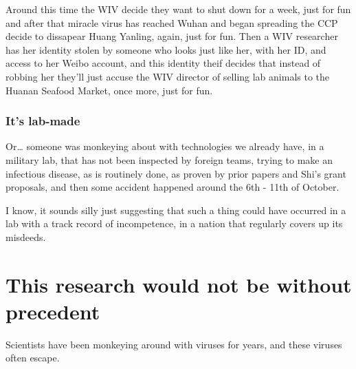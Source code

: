 \documentclass[11pt]{article}
\begin{document}
Around this time the WIV decide they want to shut down for a week, just for fun and after that miracle virus has reached Wuhan and began spreading the CCP decide to dissapear Huang Yanling, again, just for fun. Then a WIV researcher has her identity stolen by someone who looks just like her, with her ID, and access to her Weibo account, and this identity theif decides that instead of robbing her they'll just accuse the WIV director of selling lab animals to the Huanan Seafood Market, once more, just for fun.
\subsubsection{It's lab-made}
\label{sec:orgbdf7703}
Or\ldots{} someone was monkeying about with technologies we already have, in a military lab, that has not been inspected by foreign teams, trying to make an infectious disease, as is routinely done, as proven by prior papers and Shi's grant proposals, and then some accident happened around the 6th - 11th of October.

I know, it sounds silly just suggesting that such a thing could have occurred in a lab with a track record of incompetence, in a nation that regularly covers up its misdeeds.
\section{This research would not be without precedent}
\label{sec:org996f98b}
Scientists have been monkeying around with viruses for years, and these viruses often escape.
\end{document}

